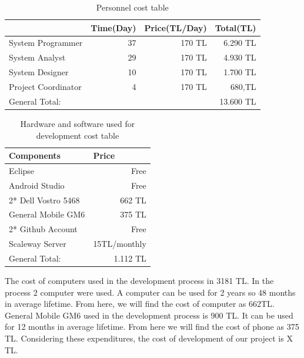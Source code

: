 \begin{table}[!h!]
\centering
\caption{Personnel cost table}
\label{tab:maas}
\begin{tabular}{|l|r|r|r|}
\hline
& \multicolumn{1}{l|}{\textbf{Time(Day)}} & \multicolumn{1}{l|}{\textbf{Price(TL/Day)}} & \multicolumn{1}{l|}{\textbf{Total(TL)}} \\ \hline
System Programmer   & 37                                      & 170 TL                                      & 6.290 TL                                 \\ \hline
System Analyst      & 29                                      & 170 TL                                      & 4.930 TL                                 \\ \hline
System Designer     & 10                                      & 170 TL                                      & 1.700 TL                                 \\ \hline
Project Coordinator & 4                                       & 170 TL                                      & 680,TL                                  \\ \hline
General Total:      & \multicolumn{3}{r|}{13.600 TL}                                                                                                  \\ \hline
\end{tabular}
\end{table}

\begin{table}[!h!]
\centering
\caption{Hardware and software used for development cost table}
\label{tab:hardsoftcost}
\begin{tabular}{|l|r|}
\hline
\textbf{Components}             & \multicolumn{1}{l|}{\textbf{Price}} \\ \hline
Eclipse \cite{eclipse} & Free \\ \hline
Android Studio \cite{androidStudio} & Free \\ \hline
2* Dell Vostro 5468 & 662 TL \\ \hline
General Mobile GM6 \cite{gm6} & 375 TL                            \\ \hline
2* Github Account                  & Free                             \\ \hline
Scaleway Server                  & 15TL/monthly                             \\ \hline
General Total:                  & 1.112 TL                            \\ \hline
\end{tabular}
\end{table}
The cost of computers used in the development process in 3181 TL\cite{dell}. In the process 2 computer were used. A computer can be used for 2 years so 48 months in average lifetime. From here, we will find the cost of computer as 662TL. General Mobile GM6 used in the development process is 900 TL\cite{gm6}. It can be used for 12 months in average lifetime. From here we will find the cost of phone as 375 TL. Considering these expenditures, the cost of development of our project is X TL.


